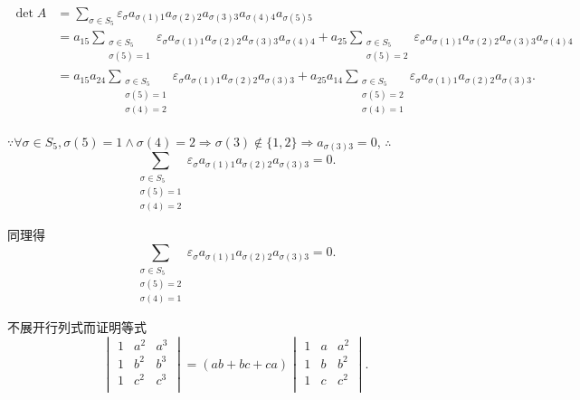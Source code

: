 \documentclass[color=black,device=normal,lang=cn,mode=geye]{elegantnote}
\begin{document}
\begin{solution}
    \begin{align*}
        \det A & =\sum\limits_{\sigma\in S_5}\varepsilon_\sigma a_{\sigma(1)1}a_{\sigma(2)2}a_{\sigma(3)3}a_{\sigma(4)4}a_{\sigma(5)5} \\
        & =a_{15}\sum\limits_{\substack{\sigma\in S_5\\\sigma(5)=1}}\varepsilon_\sigma a_{\sigma(1)1}a_{\sigma(2)2}a_{\sigma(3)3}a_{\sigma(4)4}+a_{25}\sum\limits_{\substack{\sigma\in S_5\\\sigma(5)=2}}\varepsilon_\sigma a_{\sigma(1)1}a_{\sigma(2)2}a_{\sigma(3)3}a_{\sigma(4)4} \\
        & =a_{15}a_{24}\sum\limits_{\substack{\sigma\in S_5\\\sigma(5)=1\\\sigma(4)=2}}\varepsilon_\sigma a_{\sigma(1)1}a_{\sigma(2)2}a_{\sigma(3)3}+a_{25}a_{14}\sum\limits_{\substack{\sigma\in S_5\\\sigma(5)=2\\\sigma(4)=1}}\varepsilon_\sigma a_{\sigma(1)1}a_{\sigma(2)2}a_{\sigma(3)3}.
    \end{align*}

    $\because\forall\sigma\in S_5,\sigma(5)=1\wedge\sigma(4)=2\Rightarrow\sigma(3)\notin\{1,2\}\Rightarrow a_{\sigma(3)3}=0$, $\therefore$
    \[\sum\limits_{\substack{\sigma\in S_5\\\sigma(5)=1\\\sigma(4)=2}}\varepsilon_\sigma a_{\sigma(1)1}a_{\sigma(2)2}a_{\sigma(3)3}=0.\]

    同理得
    \[\sum\limits_{\substack{\sigma\in S_5\\\sigma(5)=2\\\sigma(4)=1}}\varepsilon_\sigma a_{\sigma(1)1}a_{\sigma(2)2}a_{\sigma(3)3}=0.\]
\end{solution}
\begin{exercisec}[4.2.2(3)]
    不展开行列式而证明等式
    \[\begin{vmatrix}
        1 & a^2 & a^3 \\
        1 & b^2 & b^3 \\
        1 & c^2 & c^3 \\
    \end{vmatrix}=(ab+bc+ca)\begin{vmatrix}
        1 & a & a^2 \\
        1 & b & b^2 \\
        1 & c & c^2 \\
    \end{vmatrix}.\]
\end{exercisec}
\end{document}
